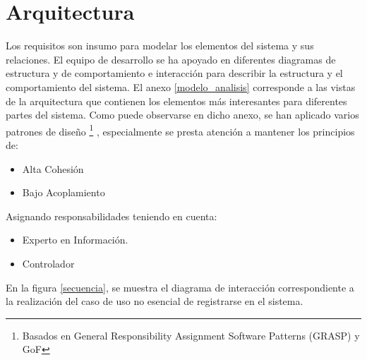 \section{Arquitectura}

Los requisitos son insumo para modelar los elementos del sistema y sus relaciones. El equipo de desarrollo se ha apoyado en diferentes diagramas de estructura y de comportamiento e interacción para describir la estructura y el comportamiento del sistema. El anexo \ref{modelo_analisis} corresponde a las vistas de la arquitectura que contienen los elementos más interesantes para diferentes partes del sistema. Como puede observarse en dicho anexo, se han aplicado varios patrones de diseño \footnote{Basados en General Responsibility Assignment Software Patterns (GRASP) y GoF} \cite{larman2003}, \cite{gamma1994} especialmente se presta atención a mantener los principios de:

\begin{itemize}
\item Alta Cohesión
\item Bajo Acoplamiento
\end{itemize}

Asignando responsabilidades teniendo en cuenta:
\begin{itemize}
\item Experto en Información.
\item Controlador
\end{itemize}

En la figura \ref{secuencia}, se muestra el diagrama de interacción correspondiente a la realización del caso de uso no esencial de registrarse en el sistema.

